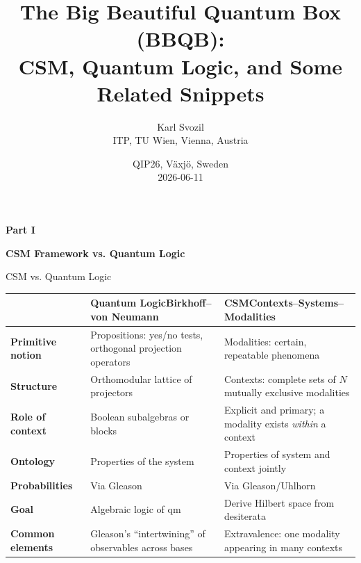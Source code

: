 \documentclass[xcolor=dvipsnames]{beamer}
\title{The Big Beautiful Quantum Box (BBQB):\\CSM, Quantum Logic, and Some Related Snippets}
\author{Karl Svozil\\ITP, TU Wien, Vienna, Austria}
\date{QIP26, V\"axj\"o, Sweden\\2026-06-11}
\newcommand{\partslide}[2]{%
  \begin{frame}[plain]
    \centering
    \vfill
    {\Large\bfseries #1}\par\vspace{2mm}
    {\Large\bfseries #2}
    \vfill
  \end{frame}
}
\begin{document}
\begin{frame}[plain]
  \titlepage
\end{frame}

\partslide{Part I}{CSM Framework vs. Quantum Logic}

\begin{frame}[shrink=8]{CSM vs. Quantum Logic}
\footnotesize
\renewcommand{\arraystretch}{1.23}
\begin{tabularx}{\textwidth}{>{\bfseries}p{}XX}
 & \textbf{Quantum Logic}\newline\normalfont Birkhoff--von Neumann
 & \textbf{CSM}\newline\normalfont Contexts--Systems--Modalities \\
\midrule
Primitive notion
  & Propositions: yes/no tests, orthogonal projection operators
  & Modalities: certain, repeatable phenomena \\
Structure
  & Orthomodular lattice of projectors
  & Contexts: complete sets of $N$ mutually exclusive modalities \\
Role of context
  & Boolean subalgebras or blocks
  & Explicit and primary; a modality exists \emph{within} a context \\
Ontology
  & Properties of the system
  & Properties of system and context jointly \\
Probabilities
  & Via Gleason
  & Via Gleason/Uhlhorn \\
Goal
  & Algebraic logic of qm
  & Derive Hilbert space from desiterata \\
Common elements
  & Gleason's ``intertwining'' of observables across bases
  & Extravalence: one modality appearing in many contexts  \\
\bottomrule
\end{tabularx}

\end{frame}
\end{document}
